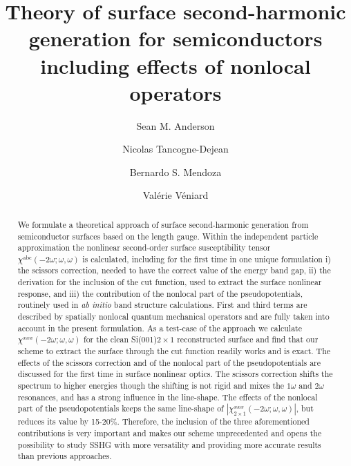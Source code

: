 \documentclass[floatfix,prb,aps,superscriptaddress,showpacs,letterpaper]{revtex4}
\begin{document}
\title{Theory of surface second-harmonic generation for 
       semiconductors including effects of nonlocal operators}

\author{Sean M. Anderson}
\author{Nicolas Tancogne-Dejean}
\author{Bernardo S. Mendoza}
\author{Val\'erie V\'eniard}

\begin{abstract}
We formulate a theoretical approach of surface second-harmonic generation 
from semiconductor surfaces based on the length gauge. 
Within the independent particle approximation 
the nonlinear second-order surface susceptibility tensor
$\chi^{\mathrm{a}\mathrm{b}\mathrm{c}}(-2\omega;\omega,\omega)$   
is calculated, including for the first time in one unique formulation
i) the scissors correction, needed to have the correct value of the
energy band gap,
ii) the derivation for the inclusion of the cut function, 
used to extract the surface nonlinear response,
and iii) the contribution of the nonlocal part of the 
pseudopotentials, routinely  used in \textit{ab initio} band structure calculations. 
First and third terms are described by spatially nonlocal quantum
mechanical operators and are fully taken into account in the present formulation. 
As a test-case of the approach we calculate 
$\chi^{xxx}(-2\omega;\omega,\omega)$ for the clean Si(001)$2\times 1$
reconstructed surface and find that our scheme to extract the surface
through the cut function
readily works and is exact. The effects of the scissors correction and
of the nonlocal part of the pseudopotentials are discussed for the
first time in surface nonlinear optics. 
The scissors correction shifts the spectrum to 
higher energies though the shifting is not rigid and mixes the 
$1\omega$ and $2\omega$ resonances, 
and has a strong influence in the line-shape. 
The 
effects of the nonlocal part of the pseudopotentials 
keeps the same line-shape of $|\chi^{xxx}_{2\times 1}(-2\omega;\omega,\omega)|$, but 
reduces its value
by 15-20\%.  
Therefore, the inclusion of the three aforementioned 
contributions is very important and 
makes our scheme unprecedented and opens the possibility to 
study SSHG with more versatility and providing more accurate results 
than previous approaches. 
\end{abstract}  
\end{document}

